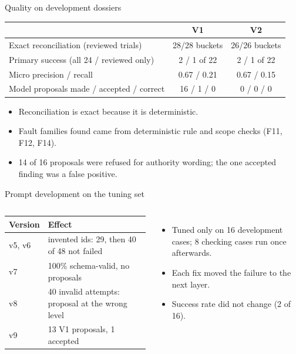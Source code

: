 \documentclass[aspectratio=169,10pt]{beamer}
\begin{document}
\begin{frame}{Quality on development dossiers}
\small
\begin{tabularx}{\linewidth}{@{}X c c@{}}
\toprule
 & \textbf{V1} & \textbf{V2} \\ \midrule
Exact reconciliation (reviewed trials) & 28/28 buckets & 26/26 buckets \\
Primary success (all 24 / reviewed only) & 2 / 1 of 22 & 2 / 1 of 22 \\
Micro precision / recall & 0.67 / 0.21 & 0.67 / 0.15 \\
Model proposals made / accepted / correct & 16 / 1 / 0 & 0 / 0 / 0 \\
\bottomrule
\end{tabularx}

\begin{itemize}
\item Reconciliation is exact because it is deterministic.
\item Fault families found came from deterministic rule and scope checks (F11, F12, F14).
\item 14 of 16 proposals were refused for authority wording; the one accepted finding was a false positive.
\end{itemize}
\end{frame}

\begin{frame}{Prompt development on the tuning set}
\begin{columns}[T]
\small
\begin{tabularx}{\linewidth}{@{}l X@{}}
\toprule
\textbf{Version} & \textbf{Effect} \\ \midrule
v5, v6 & invented ids: 29, then 40 of 48 not failed \\
v7 & 100\% schema-valid, no proposals \\
v8 & 40 invalid attempts: proposal at the wrong level \\
v9 & 13 V1 proposals, 1 accepted \\
\bottomrule
\end{tabularx}
\begin{itemize}
\item Tuned only on 16 development cases; 8 checking cases run once afterwards.
\item Each fix moved the failure to the next layer.
\item Success rate did not change (2 of 16).
\end{itemize}
\end{columns}
\end{frame}
\end{document}
